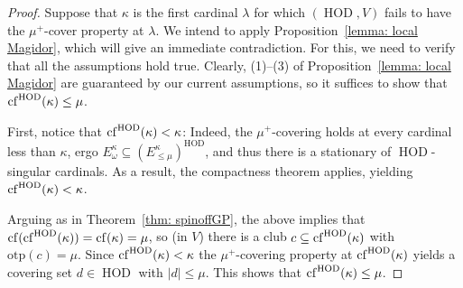 \documentclass[11pt]{amsart}
\newtheorem{theorem}{Theorem}[section]
\theoremstyle{definition}
\theoremstyle{remark}
\DeclareMathOperator{\HOD}{HOD}
\newcommand{\cf}{{\rm cf}}
\def\s{\subseteq}
\newcommand\ale[1]{\marginpar{Alejandro: #1}}
\begin{document}
\begin{proof}
Suppose  that $\kappa$ is the first cardinal $\lambda$ for which $(\HOD, V)$ fails to have the $\mu^+$-cover property at $\lambda$.  We intend to apply Proposition~\ref{lemma: local Magidor}, which will  give an immediate contradiction. For this, we need to verify that all the assumptions hold true. Clearly, (1)--(3) of Proposition~\ref{lemma: local Magidor} are guaranteed by our current assumptions, so   it suffices to show that $\cf^{\HOD}(\kappa)\leq \mu$.

First, notice that $\cf^{\HOD}(\kappa)<\kappa$: Indeed, the $\mu^+$-covering holds at every cardinal less than $\kappa$, ergo $E^\kappa_\omega \s (E^\kappa_{\leq \mu})^{\HOD}$, and thus there is a stationary  of $\HOD$-singular cardinals. As a result, the compactness theorem \cite[Theorem~3.5]{GolPov} applies, yielding $\cf^{\HOD}(\kappa)<\kappa$.

Arguing as in Theorem~\ref{thm: spinoffGP}, the above implies that  $\cf(\cf^{\HOD}(\kappa))=\cf(\kappa)=\mu$, so (in $V$) there is a club $c\s \cf^{\HOD}(\kappa)$ with $\mathrm{otp}(c)=\mu$. Since $\cf^{\HOD}(\kappa)<\kappa$ the $\mu^+$-covering property at $\cf^{\HOD}(\kappa)$ yields a covering set $d\in \HOD$ with $|d|\leq \mu$. This shows that $\cf^{\HOD}(\kappa)\leq \mu$.
\end{proof}





\end{document}
